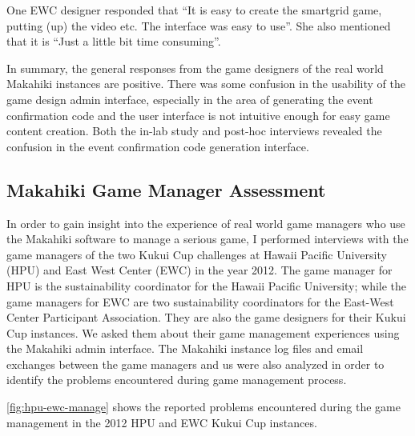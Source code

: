 One EWC designer responded that ``It is easy to create the smartgrid game, putting (up) the video etc. The interface was easy to use''. She also mentioned that it is ``Just a little bit time consuming''.

In summary, the general responses from the game designers of the real world Makahiki instances are positive. There was some confusion in the usability of the game design admin interface, especially in the area of generating the event confirmation code and the user interface is not intuitive enough for easy game content creation. Both the in-lab study and post-hoc interviews revealed the confusion in the event confirmation code generation interface.

\subsection{Makahiki Game Manager Assessment}
\label{sec:manager-interview-result} 

In order to gain insight into the experience of real world game managers who use the Makahiki software to manage a serious game, I performed interviews with the game managers of the two Kukui Cup challenges at Hawaii Pacific University (HPU) and East West Center (EWC) in the year 2012. The game manager for HPU is the sustainability coordinator for the Hawaii Pacific University; while the game managers for EWC are two sustainability coordinators for the East-West Center Participant Association. They are also the game designers for their Kukui Cup instances. We asked them about their game management experiences using the Makahiki admin
interface. The Makahiki instance log files and email exchanges between the game managers and us were also analyzed in order to identify the problems encountered during game management process.

\autoref{fig:hpu-ewc-manage} shows the reported problems encountered during the game management in the 2012 HPU and  EWC Kukui Cup instances. 

